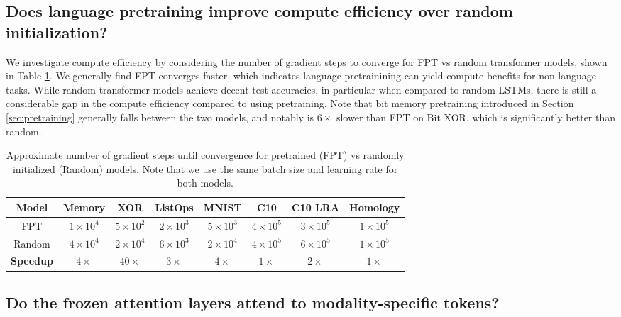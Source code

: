 \subsection{Does language pretraining improve compute efficiency over random initialization?}
\label{sec:compute_efficiency}

We investigate compute efficiency by considering the number of gradient steps to converge for FPT vs random transformer models, shown in Table \ref{table:convergence}.
We generally find FPT converges faster, which indicates language pretrainining can yield compute benefits for non-language tasks.
While random transformer models achieve decent test accuracies, in particular when compared to random LSTMs, there is still a considerable gap in the compute efficiency compared to using pretraining.
Note that bit memory pretraining introduced in Section \ref{sec:pretraining} generally falls between the two models, and notably is $6 \times$ slower than FPT on Bit XOR, which is significantly better than random.

\begin{table}[h] 
\begin{center}
\begin{tabular}{c|ccccccc}
\toprule
\textbf{Model} & \multicolumn{1}{c}{\bf Memory} & \multicolumn{1}{c}{\bf XOR} & \multicolumn{1}{c}{\bf ListOps} & \multicolumn{1}{c}{\bf MNIST} & \multicolumn{1}{c}{\bf C10} & \multicolumn{1}{c}{\bf C10 LRA} & \multicolumn{1}{c}{\bf Homology} \\
\midrule
FPT & $1 \times 10^4$ & $5 \times 10^2$ & $2 \times 10^3$ & $5 \times 10^3$ & $4 \times 10^5$ & $3 \times 10^5$ & $1 \times 10^5$\\
Random & $4 \times 10^4$ & $2 \times 10^4$ & $6 \times 10^3$ & $2 \times 10^4$ & $4 \times 10^5$ & $6 \times 10^5$ & $1 \times 10^5$ \\
\midrule
\textbf{Speedup} & $4 \times$ & $40\times$ & $3 \times$ & $4 \times$ & $1 \times$ & $2 \times$ & $1 \times$ \\
\bottomrule
\end{tabular}
\end{center}
\caption{Approximate number of gradient steps until convergence for pretrained (FPT) vs randomly initialized (Random) models. Note that we use the same batch size and learning rate for both models.}\label{table:convergence}
\end{table}

\subsection{Do the frozen attention layers attend to modality-specific tokens?}
\label{sec:attention_maps}


